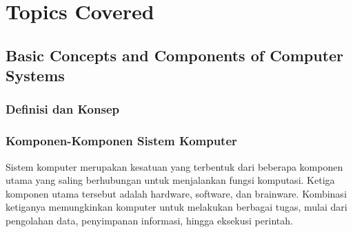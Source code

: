 \documentclass[12pt]{article}
\begin{document}
\section{Topics Covered}

\subsection{Basic Concepts and Components of Computer Systems}
    \subsubsection{Definisi dan Konsep}
    \subsubsection{Komponen-Komponen Sistem Komputer}
    Sistem komputer merupakan kesatuan yang terbentuk dari beberapa komponen utama yang saling berhubungan untuk menjalankan fungsi komputasi. Ketiga komponen utama tersebut adalah hardware, software, dan brainware. Kombinasi ketiganya memungkinkan komputer untuk melakukan berbagai tugas, mulai dari pengolahan data, penyimpanan informasi, hingga eksekusi perintah.
\end{document}
